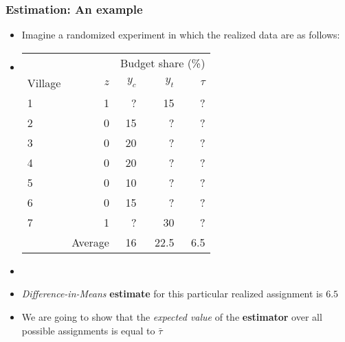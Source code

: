 \documentclass[table, xcolor={dvipsnames}, 9pt]{beamer}
\theoremstyle{newstyle}
\begin{document}
\begin{frame}
\frametitle{Estimation: An example} 
\begin{itemize}
\item Imagine a randomized experiment in which the realized data are as follows: 
\item[]
\begin{center}
\begin{tabular}{lr|rrr} \hline
& & \multicolumn{3}{c}{Budget share (\%)} \\
Village & $z$ & $y_{c}$& $y_{t}$& $\tau$  \\ \hline
1& 1 & ?  & 15  & ?  \\
2& 0 & 15 & ?   & ?   \\ 
3& 0 & 20 & ?   & ?   \\
4& 0 & 20 & ?   & ?   \\
5& 0 & 10 & ?   & ?   \\
6& 0 & 15 & ?   & ?   \\
7& 1 & ?  & 30  & ?   \\ \hline
 & Average & 16 & 22.5 & 6.5  \\ \hline
\end{tabular}
\end{center}
\item[]
\item \textit{Difference-in-Means} \textbf{estimate} for this particular realized assignment is $6.5$
\item We are going to show that the \textit{expected value} of the \textbf{estimator} over all possible assignments is equal to $\bar{\tau}$
\end{itemize}
\end{frame}
\end{document}
